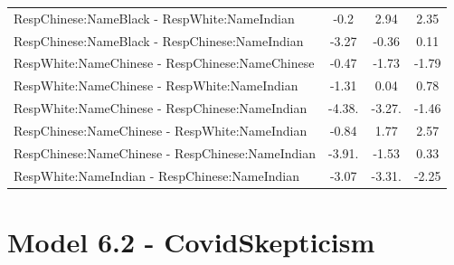 \documentclass[]{report}
\begin{document}
\begin{table}
{\begin{tabular}[t]{lccc}
		RespChinese:NameBlack - RespWhite:NameIndian & -0.2 & 2.94 & 2.35 \\ 
		RespChinese:NameBlack - RespChinese:NameIndian & -3.27 & -0.36 & 0.11 \\ 
		RespWhite:NameChinese - RespChinese:NameChinese & -0.47 & -1.73 & -1.79 \\ 
		RespWhite:NameChinese - RespWhite:NameIndian & -1.31 & 0.04 & 0.78 \\ 
		RespWhite:NameChinese - RespChinese:NameIndian & -4.38. & -3.27. & -1.46 \\ 
		RespChinese:NameChinese - RespWhite:NameIndian & -0.84 & 1.77 & 2.57 \\ 
		RespChinese:NameChinese - RespChinese:NameIndian & -3.91. & -1.53 & 0.33 \\ 
		RespWhite:NameIndian - RespChinese:NameIndian & -3.07 & -3.31. & -2.25 \\ 
		\bottomrule
	\end{tabular}}
\end{table}



\chapter{Model 6.2 - CovidSkepticism}
\end{document}
